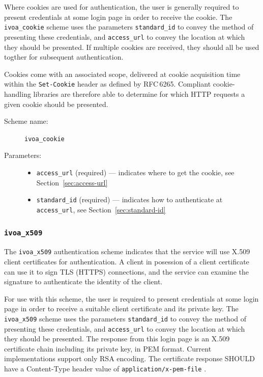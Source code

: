 \documentclass[11pt,a4paper]{ivoa}
\newcommand{\rfc}[1]{RFC\,#1}
\begin{document}
Where cookies are used for authentication, the user is generally required
to present credentials at some login page in order to receive the cookie.
The \verb|ivoa_cookie| scheme uses the parameters 
\verb|standard_id| to convey the method of presenting these credentials, and
\verb|access_url| to convey the location at which they should be presented.
If multiple cookies are received, they should all be used togther
for subsequent authentication.

Cookies come with an associated scope,
delivered at cookie acquisition time within the {\tt Set-Cookie} header
as defined by \rfc{6265}.
Compliant cookie-handling libraries are therefore able to determine
for which HTTP requests a given cookie should be presented.

\begin{description}
  \item[Scheme name:] \verb|ivoa_cookie|
  \item[Parameters:] \mbox{}
  \begin{itemize}
    \item \verb|access_url| (required) ---
          indicates where to get the cookie,
          see Section~\ref{sec:access-url}
    \item \verb|standard_id| (required) ---
          indicates how to authenticate at \verb|access_url|,
          see Section~\ref{sec:standard-id}
  \end{itemize}
\end{description}


\subsubsection{\mbox{\tt ivoa\_x509}}\label{sec:ivoa-x509}


The \verb|ivoa_x509| authentication scheme indicates that the
service will use X.509 client certificates for authentication.
A client in posession of a client certificate can use it to
sign TLS (HTTPS) connections, and the service can examine the signature
to authenticate the identity of the client.


For use with this scheme, the user is required to present credentials
at some login page in order to receive a suitable client certificate
and its private key.
The \verb|ivoa_x509| scheme uses the parameters 
\verb|standard_id| to convey the method of presenting these credentials, and
\verb|access_url| to convey the location at which they should be presented.
The response from this login page is an X.509 certificate chain 
including its private key, in PEM format.
Current implementations support only RSA encoding.
The certificate response SHOULD have a Content-Type header value of
{\tt application/x-pem-file} .
\end{document}
